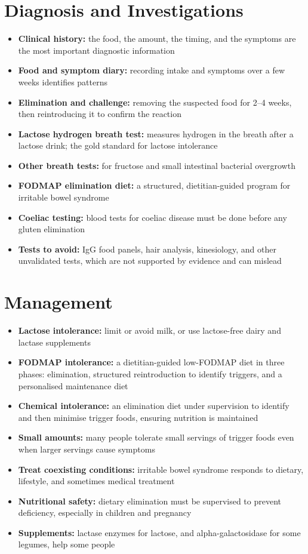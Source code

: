 \section*{Diagnosis and Investigations}
\begin{itemize}
    \item \textbf{Clinical history:} the food, the amount, the timing, and the symptoms are the most important diagnostic information
    \item \textbf{Food and symptom diary:} recording intake and symptoms over a few weeks identifies patterns
    \item \textbf{Elimination and challenge:} removing the suspected food for 2--4 weeks, then reintroducing it to confirm the reaction
    \item \textbf{Lactose hydrogen breath test:} measures hydrogen in the breath after a lactose drink; the gold standard for lactose intolerance
    \item \textbf{Other breath tests:} for fructose and small intestinal bacterial overgrowth
    \item \textbf{FODMAP elimination diet:} a structured, dietitian-guided program for irritable bowel syndrome
    \item \textbf{Coeliac testing:} blood tests for coeliac disease must be done before any gluten elimination
    \item \textbf{Tests to avoid:} IgG food panels, hair analysis, kinesiology, and other unvalidated tests, which are not supported by evidence and can mislead
\end{itemize}

\section*{Management}
\begin{itemize}
    \item \textbf{Lactose intolerance:} limit or avoid milk, or use lactose-free dairy and lactase supplements
    \item \textbf{FODMAP intolerance:} a dietitian-guided low-FODMAP diet in three phases: elimination, structured reintroduction to identify triggers, and a personalised maintenance diet
    \item \textbf{Chemical intolerance:} an elimination diet under supervision to identify and then minimise trigger foods, ensuring nutrition is maintained
    \item \textbf{Small amounts:} many people tolerate small servings of trigger foods even when larger servings cause symptoms
    \item \textbf{Treat coexisting conditions:} irritable bowel syndrome responds to dietary, lifestyle, and sometimes medical treatment
    \item \textbf{Nutritional safety:} dietary elimination must be supervised to prevent deficiency, especially in children and pregnancy
    \item \textbf{Supplements:} lactase enzymes for lactose, and alpha-galactosidase for some legumes, help some people
\end{itemize}

